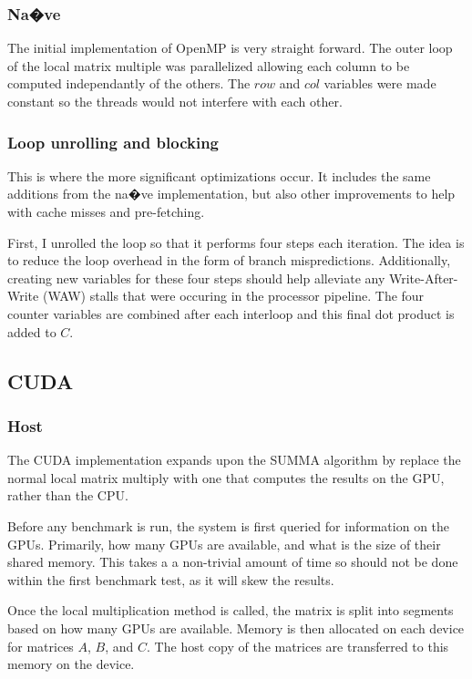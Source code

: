 \documentclass[11pt, twocolumn]{article}
\begin{document}
\subsubsection{Na�ve}
The initial implementation of OpenMP is very straight forward. The outer loop of the local matrix multiple was parallelized allowing each column to be computed independantly of the others. The $row$ and $col$ variables were made constant so the threads would not interfere with each other.

\subsubsection{Loop unrolling and blocking}
This is where the more significant optimizations occur. It includes the same additions from the na�ve implementation, but also other improvements to help with cache misses and pre-fetching.

First, I unrolled the loop so that it performs four steps each iteration. The idea is to reduce the loop overhead in the form of branch mispredictions. Additionally, creating new variables for these four steps should help alleviate any Write-After-Write (WAW) stalls that were occuring in the processor pipeline. The four counter variables are combined after each interloop and this final dot product is added to $C$.

\subsection{CUDA}
\subsubsection{Host}
The CUDA implementation expands upon the SUMMA algorithm by replace the normal local matrix multiply with one that computes the results on the GPU, rather than the CPU.

Before any benchmark is run, the system is first queried for information on the GPUs. Primarily, how many GPUs are available, and what is the size of their shared memory. This takes a a non-trivial amount of time so should not be done within the first benchmark test, as it will skew the results.

Once the local multiplication method is called, the matrix is split into segments based on how many GPUs are available. Memory is then allocated on each device for matrices $A$, $B$, and $C$. The host copy of the matrices are transferred to this memory on the device.
\end{document}
